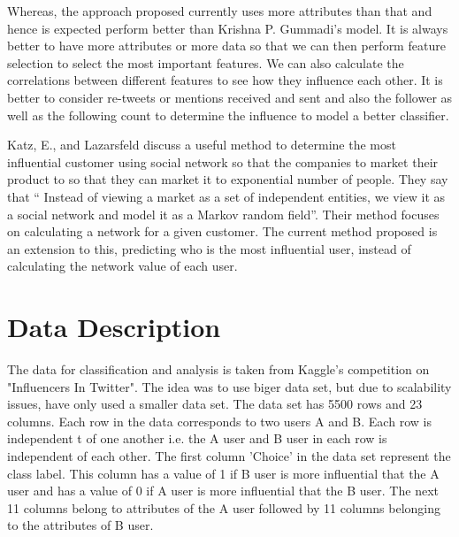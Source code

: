 \documentclass[sigconf]{acmart}
\begin{document}
Whereas, the approach proposed currently uses more attributes than that and hence is expected perform better than Krishna P. Gummadi’s model.  It is always better to have more attributes or more data so that we can then perform feature selection to select the most important features. We can also calculate the correlations between different features to see how they influence each other. It is better to consider re-tweets or mentions received and sent and also the follower as well as the following count to determine the influence to model a better classifier.

Katz, E., and Lazarsfeld discuss a useful method to determine the most influential customer using social network so that the companies to market their product to so that they can market it to exponential number of people. They say that “ Instead of viewing a market as a set of independent entities, we view it as a social network and model it as a Markov random field”.  Their method focuses on calculating a network for a given customer. The current method proposed is an extension to this, predicting who is the most influential user, instead of calculating the network value of each user.



\section{Data Description}
The data for classification and analysis is taken from Kaggle's competition on "Influencers In Twitter"\cite{}. The idea was to use biger data set, but due to scalability issues, have only used a smaller data set. The data set has 5500 rows and 23 columns. Each row in the data corresponds to two users A and B. Each row is independent t of one another i.e. the A user and B user in each row is independent of each other. The first column 'Choice' in the data set represent the class label. This column has a value of 1 if B user is more influential that the A user and has a value of 0 if A user is more influential that the B user. The next 11 columns belong to attributes of the A user followed by 11 columns belonging to the attributes of B user.
\end{document}
